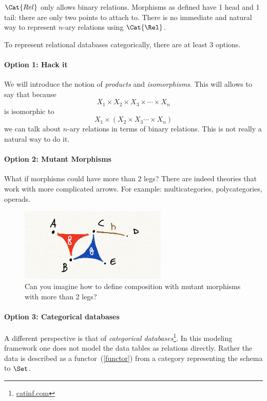 $\Cat{Rel}$ only allows binary relations. Morphisms as defined have 1 head and 1 tail:
there are only two points to attach to. There is no immediate and natural way to represent $n$-ary relations using $\Cat{\Rel}$.

To represent relational databases categorically, there are at least 3 options.

\paragraph{Option 1: Hack it}
 We will introduce the notion of \emph{products} and \emph{isomorphisms}.
    This will allows to say that because 
    $$
    X_1 \times X_2 \times X_3 \times \cdots \times X_n
    $$
    is isomorphic to 
     $$
    X_1 \times ( X_2 \times X_3 \cdots \times X_n)
    $$    
    we can talk about $n$-ary relations in terms of binary relations.
    This is not really a natural way to do it.

\paragraph{Option 2: Mutant Morphisms}
    What if morphisms could have more than 2 legs? There
    are indeed theories that work with more complicated arrows.
    For example: multicategories, polycategories, operads. 
    
\begin{figure}[h]
\centering
\includegraphics[width=7cm]{chapters/mutants.jpg}
\caption{Can you imagine how to define
composition with mutant morphisms
with more than 2 legs?}
\end{figure}
    
\paragraph{Option 3: Categorical databases}

A different perspective is that of \emph{categorical databases}\footnote{\url{catinf.com}}. In this modeling framework
one does not model the data tables as relations directly. 
Rather the data is described as a functor~(\cref{functor})
from a category representing the schema 
to $\Set$. 
